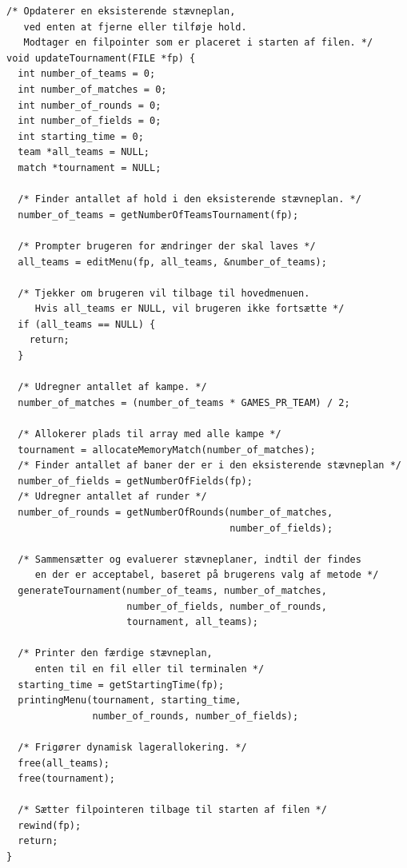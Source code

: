 \begin{source}
\begin{verbatim}
/* Opdaterer en eksisterende stævneplan, 
   ved enten at fjerne eller tilføje hold.
   Modtager en filpointer som er placeret i starten af filen. */
void updateTournament(FILE *fp) {
  int number_of_teams = 0;
  int number_of_matches = 0;
  int number_of_rounds = 0;
  int number_of_fields = 0;
  int starting_time = 0;
  team *all_teams = NULL;
  match *tournament = NULL;

  /* Finder antallet af hold i den eksisterende stævneplan. */
  number_of_teams = getNumberOfTeamsTournament(fp);

  /* Prompter brugeren for ændringer der skal laves */
  all_teams = editMenu(fp, all_teams, &number_of_teams);

  /* Tjekker om brugeren vil tilbage til hovedmenuen.
     Hvis all_teams er NULL, vil brugeren ikke fortsætte */
  if (all_teams == NULL) {
    return;
  }

  /* Udregner antallet af kampe. */
  number_of_matches = (number_of_teams * GAMES_PR_TEAM) / 2;

  /* Allokerer plads til array med alle kampe */
  tournament = allocateMemoryMatch(number_of_matches);
  /* Finder antallet af baner der er i den eksisterende stævneplan */
  number_of_fields = getNumberOfFields(fp);
  /* Udregner antallet af runder */
  number_of_rounds = getNumberOfRounds(number_of_matches, 
                                       number_of_fields);

  /* Sammensætter og evaluerer stævneplaner, indtil der findes 
     en der er acceptabel, baseret på brugerens valg af metode */
  generateTournament(number_of_teams, number_of_matches, 
                     number_of_fields, number_of_rounds, 
                     tournament, all_teams);

  /* Printer den færdige stævneplan, 
     enten til en fil eller til terminalen */
  starting_time = getStartingTime(fp);
  printingMenu(tournament, starting_time, 
               number_of_rounds, number_of_fields);

  /* Frigører dynamisk lagerallokering. */
  free(all_teams);
  free(tournament);

  /* Sætter filpointeren tilbage til starten af filen */
  rewind(fp);
  return;
}
\end{verbatim}
\label{code:updateTournament}
\end{source}
